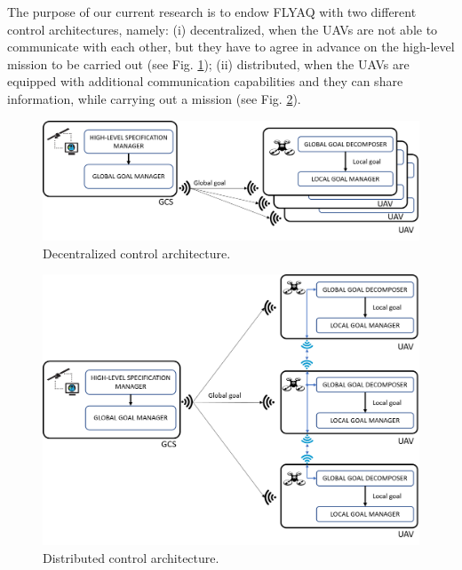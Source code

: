 \documentclass[letterpaper, 10 pt, conference]{ieeeconf}
\begin{document}
The purpose of our current research is to endow FLYAQ with two different control architectures, namely: (i) decentralized, when the UAVs are not able to communicate with each other, but they have to agree in advance on the high-level mission to be carried out (see Fig. \ref{fig:decentralized-architecture}); (ii) distributed, when the UAVs are equipped with additional communication capabilities and they can share information, while carrying out a mission (see Fig. \ref{fig:distributed-architecture}).
%
\begin{figure}
	\centering
	\includegraphics[width=0.9\linewidth]{"fig/decentralized architecture"}
				\vspace*{-0.4cm}
	\caption{Decentralized control architecture.}
	\label{fig:decentralized-architecture}
			\vspace*{-0.2cm}
\end{figure}
%
\begin{figure}
	\centering
	\includegraphics[width=0.9\linewidth]{"fig/distributed2"}
					\vspace*{-0.4cm}
	\caption{Distributed control architecture.}
	\label{fig:distributed-architecture}
			\vspace*{-0.6cm}
\end{figure}
\end{document}
